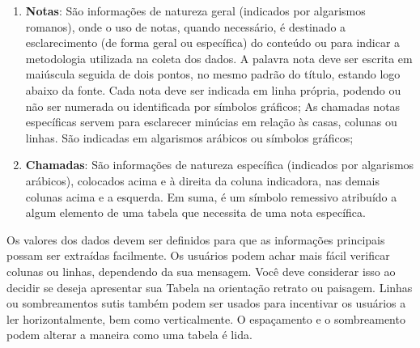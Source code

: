 \begin{enumerate}
  \item \textbf{Notas}: São informações de natureza geral (indicados por algarismos romanos), onde o uso de notas, quando necessário, é destinado a esclarecimento (de forma geral ou específica) do conteúdo ou para indicar a metodologia utilizada na coleta dos dados. A palavra nota deve ser escrita em maiúscula seguida de dois pontos, no mesmo padrão do título, estando logo abaixo da fonte. Cada nota deve ser indicada em linha própria, podendo ou não ser numerada ou identificada por símbolos gráficos; As chamadas notas específicas servem para esclarecer minúcias em relação às casas, colunas ou linhas. São indicadas em algarismos arábicos ou símbolos gráficos;
  \item \textbf{Chamadas}: São informações de natureza específica (indicados por algarismos arábicos), colocados acima
  e à direita da coluna indicadora, nas demais colunas acima e a esquerda.
  Em suma, é um símbolo remessivo atribuído a algum elemento de uma tabela
  que necessita de uma nota específica.
\end{enumerate}


\begin{figure}[!htb]
\end{figure}


Os valores dos dados devem ser definidos para que as informações principais possam ser extraídas facilmente. Os usuários podem achar mais fácil verificar colunas ou linhas, dependendo da sua mensagem. Você deve considerar isso ao decidir se deseja apresentar sua Tabela na orientação retrato ou paisagem. Linhas ou sombreamentos sutis também podem ser usados ​​para incentivar os usuários a ler horizontalmente, bem como verticalmente. O espaçamento e o sombreamento podem alterar a maneira como uma tabela é lida.





